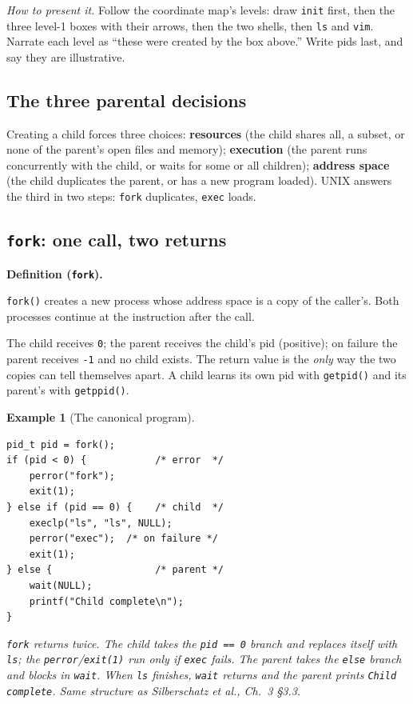 \documentclass[11pt]{article}
\newtheorem{example}{Example}
\newenvironment{definitionbox}[1]{%
  \par\noindent\textbf{Definition (#1).}\ \itshape
}{\par\vspace{0.3em}}
\begin{document}
\emph{How to present it.} Follow the coordinate map's levels: draw \texttt{init} first, then the three level-1 boxes with their arrows, then the two shells, then \texttt{ls} and \texttt{vim}. Narrate each level as ``these were created by the box above.'' Write pids last, and say they are illustrative.

\subsection*{The three parental decisions}

Creating a child forces three choices: \textbf{resources} (the child shares all, a subset, or none of the parent's open files and memory); \textbf{execution} (the parent runs concurrently with the child, or waits for some or all children); \textbf{address space} (the child duplicates the parent, or has a new program loaded). UNIX answers the third in two steps: \texttt{fork} duplicates, \texttt{exec} loads.

\subsection*{\texttt{fork}: one call, two returns}

\begin{definitionbox}{\texttt{fork}}
\texttt{fork()} creates a new process whose address space is a copy of the caller's. Both processes continue at the instruction after the call.
\end{definitionbox}

The child receives \texttt{0}; the parent receives the child's pid (positive); on failure the parent receives \texttt{-1} and no child exists. The return value is the \emph{only} way the two copies can tell themselves apart. A child learns its own pid with \texttt{getpid()} and its parent's with \texttt{getppid()}.

\begin{example}[The canonical program]
\begin{verbatim}
pid_t pid = fork();
if (pid < 0) {            /* error  */
    perror("fork");
    exit(1);
} else if (pid == 0) {    /* child  */
    execlp("ls", "ls", NULL);
    perror("exec");  /* on failure */
    exit(1);
} else {                  /* parent */
    wait(NULL);
    printf("Child complete\n");
}
\end{verbatim}
\texttt{fork} returns twice. The child takes the \texttt{pid == 0} branch and replaces itself with \texttt{ls}; the \texttt{perror}/\texttt{exit(1)} run only if \texttt{exec} fails. The parent takes the \texttt{else} branch and blocks in \texttt{wait}. When \texttt{ls} finishes, \texttt{wait} returns and the parent prints \texttt{Child complete}. Same structure as Silberschatz et al., Ch.~3 \S3.3.
\end{example}
\end{document}
